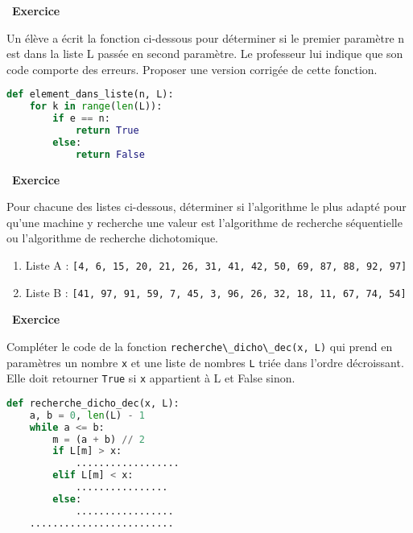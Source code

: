 \documentclass[
  11pt,
]{article}
\newcommand{\passthrough}[1]{#1}
\providecommand{\tightlist}{%
  \setlength{\itemsep}{0pt}\setlength{\parskip}{0pt}}
\newcounter{exo}
\newenvironment{exercice}[1]
{\par \medskip   \addtocounter{exo}{1} \noindent  
\begin{bclogo}[arrondi =0.1,   noborder = true, logo=\bccrayon, marge=4]{~\textbf{Exercice} \textbf{\theexo} {\itshape #1} }  \par}
{
\end{bclogo}
 \par \bigskip }
\newcounter{thme}
\newcounter{def}
\newcounter{alg}
\begin{document}
\begin{exercice}{}

Un élève a écrit la fonction ci-dessous pour déterminer si le premier
paramètre n est dans la liste L passée en second paramètre. Le
professeur lui indique que son code comporte des erreurs. Proposer une
version corrigée de cette fonction.

\begin{lstlisting}[language=Python]
def element_dans_liste(n, L):
    for k in range(len(L)):
        if e == n:
            return True
        else:
            return False
\end{lstlisting}

\end{exercice}

\begin{exercice}{}

Pour chacune des listes ci-dessous, déterminer si l'algorithme le plus
adapté pour qu'une machine y recherche une valeur est l'algorithme de
recherche séquentielle ou l'algorithme de recherche dichotomique.

\begin{enumerate}
\def\labelenumi{\arabic{enumi}.}
\tightlist
\item
  Liste A :
  \passthrough{\lstinline![4, 6, 15, 20, 21, 26, 31, 41, 42, 50, 69, 87, 88, 92, 97]!}
\item
  Liste B :
  \passthrough{\lstinline![41, 97, 91, 59, 7, 45, 3, 96, 26, 32, 18, 11, 67, 74, 54]!}
\end{enumerate}

\end{exercice}

\begin{exercice}{}

Compléter le code de la fonction
\passthrough{\lstinline!recherche\_dicho\_dec(x, L)!} qui prend en
paramètres un nombre \passthrough{\lstinline!x!} et une liste de nombres
\passthrough{\lstinline!L!} triée dans l'ordre décroissant. Elle doit
retourner \passthrough{\lstinline!True!} si \passthrough{\lstinline!x!}
appartient à L et False sinon.

\begin{lstlisting}[language=Python]
def recherche_dicho_dec(x, L):
    a, b = 0, len(L) - 1
    while a <= b:
        m = (a + b) // 2
        if L[m] > x:
            ..................
        elif L[m] < x:
            ................
        else:
            .................
    .........................
\end{lstlisting}

\end{exercice}
\end{document}
